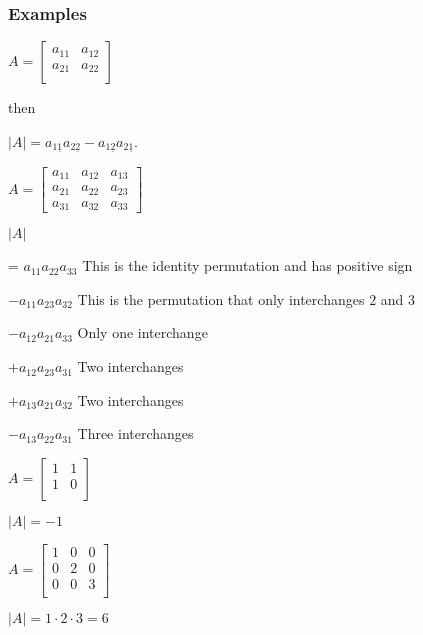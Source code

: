 \documentclass[12pt,a4paper]{article}
\theoremstyle{regla}
\theoremstyle{remark}
\theoremstyle{definition}
\theoremstyle{nonumberbreak}
\begin{document}
\subsubsection{Examples}
\begin{xmpl}

$A=
\begin{bmatrix}
a_{11} & a_{12}  \\
a_{21} & a_{22}  \\
\end{bmatrix}$

then

$\vert A \vert = a_{1\underline{1}} a_{2\underline{2}} - a_{1\underline{2}}a_{2\underline{1}}$.
\end{xmpl}
\begin{xmpl}


$A=
\begin{bmatrix}
a_{11} & a_{12} & a_{13}  \\
a_{21} & a_{22} & a_{23} \\
a_{31} & a_{32} & a_{33}
\end{bmatrix}$

                                                
$\vert A \vert$ 

=  $a_{11} a_{22} a_{33}$   This is the identity permutation and has positive sign

  $-a_{11} a_{23} a_{32}$   This is the permutation that only interchanges $2$ and $3$

  $-a_{12} a_{21} a_{33}$   Only one interchange

  $+a_{12} a_{23} a_{31}$   Two interchanges

  $+a_{13} a_{21} a_{32}$   Two interchanges

  $-a_{13} a_{22} a_{31}$   Three interchanges
\end{xmpl}
\begin{xmpl}


$A=
\begin{bmatrix}
1 & 1  \\
1 & 0  \\
\end{bmatrix}$

$\vert A \vert = -1$

\end{xmpl}
\begin{xmpl}

$A=
\begin{bmatrix}
1 & 0 & 0  \\
0 & 2 & 0  \\
0 & 0 & 3  \\
\end{bmatrix}$

$\vert A \vert = 1 \cdot 2 \cdot 3 = 6$
\end{xmpl}
\end{document}
